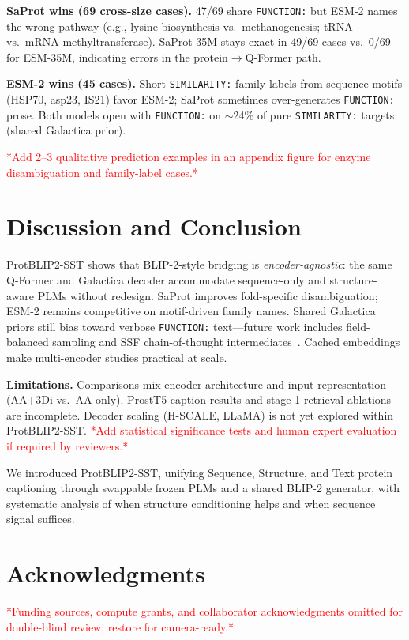 \documentclass{article}
\newcommand{\tbd}[1]{\textcolor{red}{*#1*}}
\begin{document}
\textbf{SaProt wins (69 cross-size cases).}
47/69 share \texttt{FUNCTION:} but ESM-2 names the wrong pathway (e.g., lysine biosynthesis vs.\ methanogenesis; tRNA vs.\ mRNA methyltransferase).
SaProt-35M stays exact in 49/69 cases vs.\ 0/69 for ESM-35M, indicating errors in the protein$\rightarrow$Q-Former path.

\textbf{ESM-2 wins (45 cases).}
Short \texttt{SIMILARITY:} family labels from sequence motifs (HSP70, asp23, IS21) favor ESM-2; SaProt sometimes over-generates \texttt{FUNCTION:} prose.
Both models open with \texttt{FUNCTION:} on $\sim$24\% of pure \texttt{SIMILARITY:} targets (shared Galactica prior).

\tbd{Add 2--3 qualitative prediction examples in an appendix figure for enzyme disambiguation and family-label cases.}

\section{Discussion and Conclusion}

ProtBLIP2-SST shows that BLIP-2-style bridging is \emph{encoder-agnostic}: the same Q-Former and Galactica decoder accommodate sequence-only and structure-aware PLMs without redesign.
SaProt improves fold-specific disambiguation; ESM-2 remains competitive on motif-driven family names.
Shared Galactica priors still bias toward verbose \texttt{FUNCTION:} text---future work includes field-balanced sampling and SSF chain-of-thought intermediates~\cite{su2025protrek}.
Cached embeddings make multi-encoder studies practical at scale.

\textbf{Limitations.}
Comparisons mix encoder architecture and input representation (AA+3Di vs.\ AA-only).
ProstT5 caption results and stage-1 retrieval ablations are incomplete.
Decoder scaling (H-SCALE, LLaMA) is not yet explored within ProtBLIP2-SST.
\tbd{Add statistical significance tests and human expert evaluation if required by reviewers.}

We introduced ProtBLIP2-SST, unifying Sequence, Structure, and Text protein captioning through swappable frozen PLMs and a shared BLIP-2 generator, with systematic analysis of when structure conditioning helps and when sequence signal suffices.

\section*{Acknowledgments}
\tbd{Funding sources, compute grants, and collaborator acknowledgments omitted for double-blind review; restore for camera-ready.}




\end{document}
